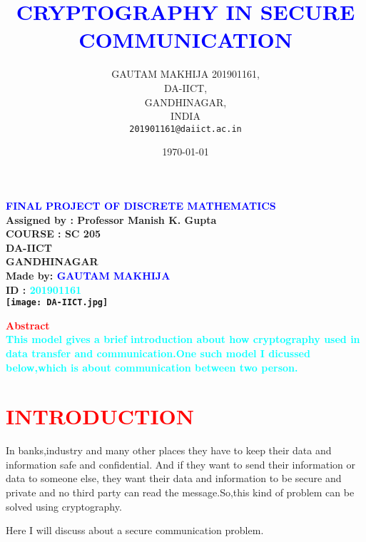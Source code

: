 \documentclass[12pt]{article}
\begin{document}
\title{\textcolor{blue}{CRYPTOGRAPHY IN SECURE COMMUNICATION}}
\begin{center}
\Huge
{\bf \textcolor{blue}{ 
{ FINAL PROJECT OF DISCRETE MATHEMATICS }       \\
}
}
\vspace{2 cm}
\huge\bf
{ 
  Assigned by : Professor Manish K. Gupta  \\
  COURSE      : SC 205   \\
  DA-IICT      \\
  GANDHINAGAR  \\
}
\vspace{5 cm}
\LARGE{
{ 
  Made by: \textcolor{blue}{GAUTAM MAKHIJA }   \\
  ID  : \textcolor{cyan}{201901161} \\
    \texttt{[image: DA-IICT.jpg]}\\

}
}
\end{center}
\author{
         GAUTAM MAKHIJA 
         201901161,\\
         DA-IICT,\\
         GANDHINAGAR,\\
         INDIA\\
         \texttt{201901161@daiict.ac.in}
      }  
\date{\today}
\maketitle
\begin{center}
\LARGE{\textbf{\textcolor{red}{Abstract}}}\\
\Large{\textbf{\textcolor{cyan}{{This model gives a brief introduction about how cryptography used in data transfer and communication.One such model I dicussed below,which is about communication between two person.}}}}
\end{center}
\newpage
\Large
\section{\textcolor{red}{INTRODUCTION}}
\hspace{1 cm}
   In banks,industry and many other places they have to keep their data and information safe and confidential. And if they want to send their information or data to someone else, they want their data and information to be secure and private and no third party can read the message.So,this kind of problem can be solved using cryptography.

    Here I will discuss about a secure communication problem.
            
\end{document}
